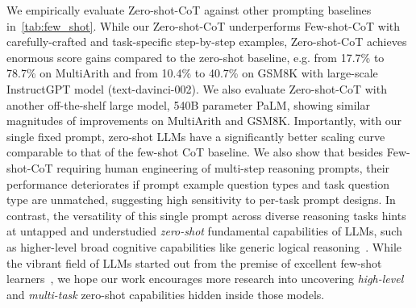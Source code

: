 \documentclass{article}
\newcommand{\sg}[1]{{\color{orange}[{#1} --SG]}}
\newcommand{\yi}[1]{{\color{magenta}[{#1} --YI]}}
\newcommand{\ours}{Zero-shot-CoT\xspace}
\newcommand{\theirs}{Few-shot-CoT\xspace}
\begin{document}
We empirically evaluate \ours against other prompting baselines in~\autoref{tab:few_shot}. While our \ours underperforms \theirs with carefully-crafted and task-specific step-by-step examples, \ours achieves enormous score gains compared to the zero-shot baseline, e.g. from 17.7\% to 78.7\% on MultiArith and from 10.4\% to 40.7\% on GSM8K with large-scale InstructGPT model (text-davinci-002). 
We also evaluate \ours with another off-the-shelf large model, 540B parameter PaLM, showing similar magnitudes of improvements on MultiArith and GSM8K. 
Importantly, with our single fixed prompt, zero-shot LLMs have a significantly better scaling curve comparable to that of the few-shot CoT baseline. 
We also show that besides \theirs requiring human engineering of multi-step reasoning prompts, their performance deteriorates if prompt example question types and task question type are unmatched, suggesting high sensitivity to per-task prompt designs.   
In contrast, the versatility of this single prompt across diverse reasoning tasks hints at untapped and understudied \textit{zero-shot} fundamental capabilities of LLMs, such as higher-level broad cognitive capabilities like generic logical reasoning~\citep{chollet2019measure}. 
While the vibrant field of LLMs started out from the premise of excellent few-shot learners~\citep{brown2020language}, we hope our work encourages more research into uncovering \textit{high-level} and \textit{multi-task} zero-shot capabilities hidden inside those models. %




\end{document}
